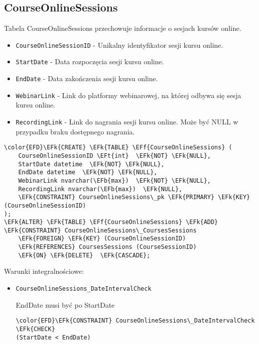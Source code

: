 \documentclass[11pt]{article}
\newcommand{\EFk}[1]{\textcolor{EFk}{\textbf{#1}}} %
\newcommand{\EFb}[1]{\textcolor{EFb}{\textbf{#1}}} %
\newcommand{\EFf}[1]{\textcolor{EFf}{#1}} %
\newcommand{\EFt}[1]{\textcolor{EFt}{\textbf{#1}}} %
\begin{document}
\subsection{CourseOnlineSessions}
\label{sec:orgab7b302}
Tabela CourseOnlineSessions przechowuje informacje o sesjach kursów online.
\begin{itemize}
\item \texttt{CourseOnlineSessionID} - Unikalny identyfikator sesji kursu online.
\item \texttt{StartDate} - Data rozpoczęcia sesji kursu online.
\item \texttt{EndDate} - Data zakończenia sesji kursu online.
\item \texttt{WebinarLink} - Link do platformy webinarowej, na której odbywa się sesja kursu online.
\item \texttt{RecordingLink} - Link do nagrania sesji kursu online. Może być NULL w przypadku braku dostępnego nagrania.
\end{itemize}
\begin{Code}
\begin{Verbatim}
\color{EFD}\EFk{CREATE} \EFk{TABLE} \EFf{CourseOnlineSessions} (
    CourseOnlineSessionID \EFt{int}  \EFk{NOT} \EFk{NULL},
    StartDate datetime  \EFk{NOT} \EFk{NULL},
    EndDate datetime  \EFk{NOT} \EFk{NULL},
    WebinarLink nvarchar(\EFb{max})  \EFk{NOT} \EFk{NULL},
    RecordingLink nvarchar(\EFb{max})  \EFk{NULL},
    \EFk{CONSTRAINT} CourseOnlineSessions\_pk \EFk{PRIMARY} \EFk{KEY}  (CourseOnlineSessionID)
);
\EFk{ALTER} \EFk{TABLE} \EFf{CourseOnlineSessions} \EFk{ADD} \EFk{CONSTRAINT} CourseOnlineSessions\_CoursesSessions
    \EFk{FOREIGN} \EFk{KEY} (CourseOnlineSessionID)
    \EFk{REFERENCES} CoursesSessions (CourseSessionID)
    \EFk{ON} \EFk{DELETE}  \EFk{CASCADE};
\end{Verbatim}
\end{Code}
Warunki integralnościowe:


\begin{itemize}
\item \texttt{CourseOnlineSessions\_DateIntervalCheck}

EndDate musi być po StartDate
\begin{Code}
\begin{Verbatim}
\color{EFD}\EFk{CONSTRAINT} CourseOnlineSessions\_DateIntervalCheck \EFk{CHECK}
(StartDate < EndDate)
\end{Verbatim}
\end{Code}
\end{itemize}
\end{document}
